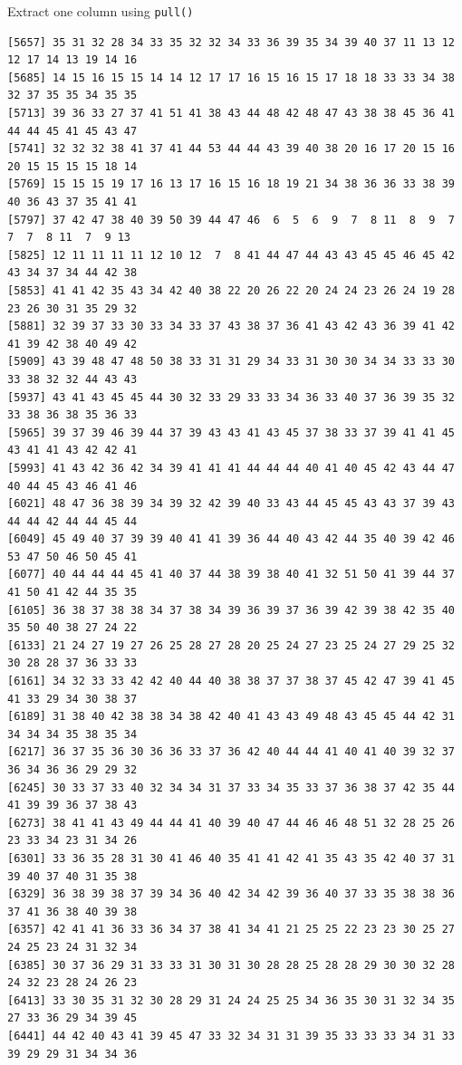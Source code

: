 \documentclass[
  ignorenonframetext,
  aspectratio=169,
]{beamer}
\let\oldtexttt\texttt
\renewcommand{\texttt}[1]{\colorbox{gray!20}{\oldtexttt{#1}}}
\begin{document}
\begin{frame}[fragile]{Extract one column using \texttt{pull()}}
\begin{verbatim}
[5657] 35 31 32 28 34 33 35 32 32 34 33 36 39 35 34 39 40 37 11 13 12 12 17 14 13 19 14 16
[5685] 14 15 16 15 15 14 14 12 17 17 16 15 16 15 17 18 18 33 33 34 38 32 37 35 35 34 35 35
[5713] 39 36 33 27 37 41 51 41 38 43 44 48 42 48 47 43 38 38 45 36 41 44 44 45 41 45 43 47
[5741] 32 32 32 38 41 37 41 44 53 44 44 43 39 40 38 20 16 17 20 15 16 20 15 15 15 15 18 14
[5769] 15 15 15 19 17 16 13 17 16 15 16 18 19 21 34 38 36 36 33 38 39 40 36 43 37 35 41 41
[5797] 37 42 47 38 40 39 50 39 44 47 46  6  5  6  9  7  8 11  8  9  7  7  7  8 11  7  9 13
[5825] 12 11 11 11 11 12 10 12  7  8 41 44 47 44 43 43 45 45 46 45 42 43 34 37 34 44 42 38
[5853] 41 41 42 35 43 34 42 40 38 22 20 26 22 20 24 24 23 26 24 19 28 23 26 30 31 35 29 32
[5881] 32 39 37 33 30 33 34 33 37 43 38 37 36 41 43 42 43 36 39 41 42 41 39 42 38 40 49 42
[5909] 43 39 48 47 48 50 38 33 31 31 29 34 33 31 30 30 34 34 33 33 30 33 38 32 32 44 43 43
[5937] 43 41 43 45 45 44 30 32 33 29 33 33 34 36 33 40 37 36 39 35 32 33 38 36 38 35 36 33
[5965] 39 37 39 46 39 44 37 39 43 43 41 43 45 37 38 33 37 39 41 41 45 43 41 41 43 42 42 41
[5993] 41 43 42 36 42 34 39 41 41 41 44 44 44 40 41 40 45 42 43 44 47 40 44 45 43 46 41 46
[6021] 48 47 36 38 39 34 39 32 42 39 40 33 43 44 45 45 43 43 37 39 43 44 44 42 44 44 45 44
[6049] 45 49 40 37 39 39 40 41 41 39 36 44 40 43 42 44 35 40 39 42 46 53 47 50 46 50 45 41
[6077] 40 44 44 44 45 41 40 37 44 38 39 38 40 41 32 51 50 41 39 44 37 41 50 41 42 44 35 35
[6105] 36 38 37 38 38 34 37 38 34 39 36 39 37 36 39 42 39 38 42 35 40 35 50 40 38 27 24 22
[6133] 21 24 27 19 27 26 25 28 27 28 20 25 24 27 23 25 24 27 29 25 32 30 28 28 37 36 33 33
[6161] 34 32 33 33 42 42 40 44 40 38 38 37 37 38 37 45 42 47 39 41 45 41 33 29 34 30 38 37
[6189] 31 38 40 42 38 38 34 38 42 40 41 43 43 49 48 43 45 45 44 42 31 34 34 34 35 38 35 34
[6217] 36 37 35 36 30 36 36 33 37 36 42 40 44 44 41 40 41 40 39 32 37 36 34 36 36 29 29 32
[6245] 30 33 37 33 40 32 34 34 31 37 33 34 35 33 37 36 38 37 42 35 44 41 39 39 36 37 38 43
[6273] 38 41 41 43 49 44 44 41 40 39 40 47 44 46 46 48 51 32 28 25 26 23 33 34 23 31 34 26
[6301] 33 36 35 28 31 30 41 46 40 35 41 41 42 41 35 43 35 42 40 37 31 39 40 37 40 31 35 38
[6329] 36 38 39 38 37 39 34 36 40 42 34 42 39 36 40 37 33 35 38 38 36 37 41 36 38 40 39 38
[6357] 42 41 41 36 33 36 34 37 38 41 34 41 21 25 25 22 23 23 30 25 27 24 25 23 24 31 32 34
[6385] 30 37 36 29 31 33 33 31 30 31 30 28 28 25 28 28 29 30 30 32 28 24 32 23 28 24 26 23
[6413] 33 30 35 31 32 30 28 29 31 24 24 25 25 34 36 35 30 31 32 34 35 27 33 36 29 34 39 45
[6441] 44 42 40 43 41 39 45 47 33 32 34 31 31 39 35 33 33 33 34 31 33 39 29 29 31 34 34 36

\end{verbatim}
\end{frame}
\end{document}
